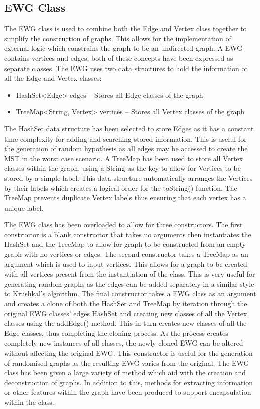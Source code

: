 \documentclass{AISB2008}
\begin{document}
{\subsection{EWG Class}

The EWG class is used to combine both the Edge and Vertex class together to simplify the construction of graphs. This allows for the implementation of external logic which constrains the graph to be an undirected graph.
A EWG contains vertices and edges, both of these concepts have been expressed as separate classes. The EWG uses two data structures to hold the information of all the Edge and Vertex classes:

\begin{itemize}
\item HashSet<Edge> edges – Stores all Edge classes of the graph
\item TreeMap<String, Vertex> vertices – Stores all Vertex classes of the graph
\end{itemize}

The HashSet data structure has been selected to store Edges as it has a constant time complexity for adding and searching stored information. This is useful for the generation of random hypothesis as all edges may be accessed to create the MST in the worst case scenario.
A TreeMap has been used to store all Vertex classes within the graph, using a String as the key to allow for Vertices to be stored by a simple label. This data structure automatically arranges the Vertices by their labels which creates a logical order for the toString() function. The TreeMap prevents duplicate Vertex labels thus ensuring that each vertex has a unique label.

The EWG class has been overloaded to allow for three constructors. The first constructor is a blank constructor that takes no arguments then instantiates the HashSet and the TreeMap to allow for graph to be constructed from an empty graph with no vertices or edges. The second constructor takes a TreeMap as an argument which is used to input vertices. This allows for a graph to be created with all vertices present from the instantiation of the class. This is very useful for generating random graphs as the edges can be added separately in a similar style to Krushkal’s algorithm. The final constructor takes a EWG class as an argument and creates a clone of both the HashSet and TreeMap by iteration through the original EWG classes’ edges HashSet and creating new classes of all the Vertex classes using the addEdge() method. This in turn creates new classes of all the Edge classes, thus completing the cloning process. As the process creates completely new instances of all classes, the newly cloned EWG can be altered without affecting the original EWG. This constructor is useful for the generation of randomised graphs as the resulting EWG varies from the original.
The EWG class has been given a large variety of method which aid with the creation and deconstruction of graphs. In addition to this, methods for extracting information or other features within the graph have been produced to support encapsulation within the class.

}
\end{document}
